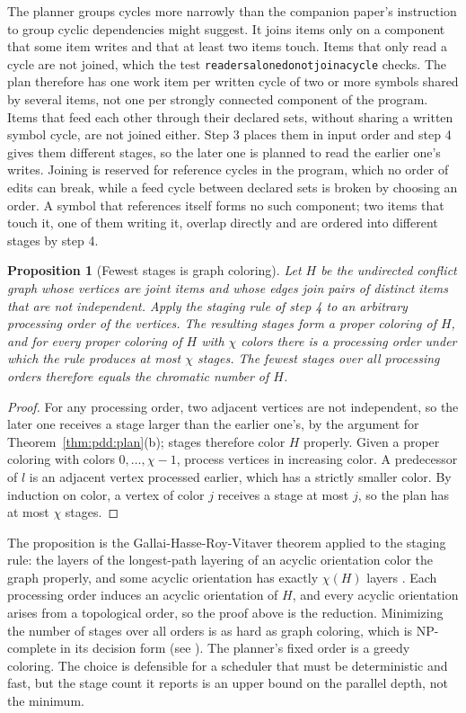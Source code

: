 \documentclass[11pt,letterpaper]{article}
\newtheorem{proposition}[theorem]{Proposition}
\theoremstyle{definition}
\theoremstyle{remark}
\DeclareRobustCommand{\code}[1]{{\def\_{\textunderscore\allowbreak}\texttt{#1}}}
\begin{document}
The planner groups cycles more narrowly than the companion paper's instruction to group cyclic dependencies might suggest. It joins items only on a component that some item writes and that at least two items touch. Items that only read a cycle are not joined, which the test \code{readers\_alone\_do\_not\_join\_a\_cycle} checks. The plan therefore has one work item per written cycle of two or more symbols shared by several items, not one per strongly connected component of the program. Items that feed each other through their declared sets, without sharing a written symbol cycle, are not joined either. Step 3 places them in input order and step 4 gives them different stages, so the later one is planned to read the earlier one's writes. Joining is reserved for reference cycles in the program, which no order of edits can break, while a feed cycle between declared sets is broken by choosing an order. A symbol that references itself forms no such component; two items that touch it, one of them writing it, overlap directly and are ordered into different stages by step 4.

\begin{proposition}[Fewest stages is graph coloring]
\label{prop:pdd:coloring}
Let $H$ be the undirected conflict graph whose vertices are joint items and whose edges join pairs of distinct items that are not independent. Apply the staging rule of step 4 to an arbitrary processing order of the vertices. The resulting stages form a proper coloring of $H$, and for every proper coloring of $H$ with $\chi$ colors there is a processing order under which the rule produces at most $\chi$ stages. The fewest stages over all processing orders therefore equals the chromatic number of $H$.
\end{proposition}

\begin{proof}
For any processing order, two adjacent vertices are not independent, so the later one receives a stage larger than the earlier one's, by the argument for Theorem~\ref{thm:pdd:plan}(b); stages therefore color $H$ properly. Given a proper coloring with colors $0,\ldots,\chi-1$, process vertices in increasing color. A predecessor of $l$ is an adjacent vertex processed earlier, which has a strictly smaller color. By induction on color, a vertex of color $j$ receives a stage at most $j$, so the plan has at most $\chi$ stages.
\end{proof}

The proposition is the Gallai-Hasse-Roy-Vitaver theorem applied to the staging rule: the layers of the longest-path layering of an acyclic orientation color the graph properly, and some acyclic orientation has exactly $\chi(H)$ layers \cite[Th\'eor\`emes~1 and~2]{roy1967}. Each processing order induces an acyclic orientation of $H$, and every acyclic orientation arises from a topological order, so the proof above is the reduction. Minimizing the number of stages over all orders is as hard as graph coloring, which is NP-complete in its decision form (see \cite{karp1972}). The planner's fixed order is a greedy coloring. The choice is defensible for a scheduler that must be deterministic and fast, but the stage count it reports is an upper bound on the parallel depth, not the minimum.
\end{document}
